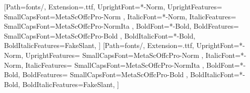 \usepackage[mathrm=sym, mathit=sym, mathsf=sym, mathbf=sym]{unicode-math}
\setmainfont{MetaOffcPro}[Path=fonts/,
Extension=.ttf,
UprightFont=*-Norm,
UprightFeatures={
	SmallCapsFont={MetaScOffcPro-Norm}
},
ItalicFont=*-Norm,
ItalicFeatures={
	SmallCapsFont={MetaScOffcPro-NormIta}
},
BoldFont=*-Bold,
BoldFeatures={
	SmallCapsFont={MetaScOffcPro-Bold}
},
BoldItalicFont=*-Bold,
BoldItalicFeatures={FakeSlant},
]
\setsansfont{MetaOffcPro}[Path=fonts/,
Extension=.ttf,
UprightFont=*-Norm,
UprightFeatures={
	SmallCapsFont={MetaScOffcPro-Norm}
},
ItalicFont=*-Norm,
ItalicFeatures={
	SmallCapsFont={MetaScOffcPro-NormIta}
},
BoldFont=*-Bold,
BoldFeatures={
	SmallCapsFont={MetaScOffcPro-Bold}
},
BoldItalicFont=*-Bold,
BoldItalicFeatures={FakeSlant},
]
%

\usepackage[english,wide,pantone312,inverse,wedge]{wwustyle-mod}